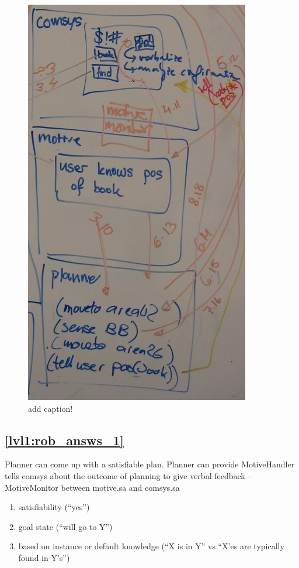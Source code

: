 \documentclass{article}
\begin{document}
\begin{figure}[bth]
\centering
	\includegraphics[width=\linewidth]{explorer_4.jpg}
	\caption{add caption!} 
\label{fig:planner}
\end{figure}



\subsection{\ref{lvl1:rob_answs_1}} Planner can come up with a satisfiable plan. Planner can provide
	MotiveHandler tells comsys about the outcome of planning to give verbal feedback
	-- MotiveMonitor between motive.sa and comsys.sa
	\begin{enumerate}
	\item satisfiability (``yes'')
	\item goal state (``will go to Y'')
	\item based on instance or default knowledge (``X is in Y'' vs ``X'es are typically found in Y's'')
	\end{enumerate}
\end{document}
